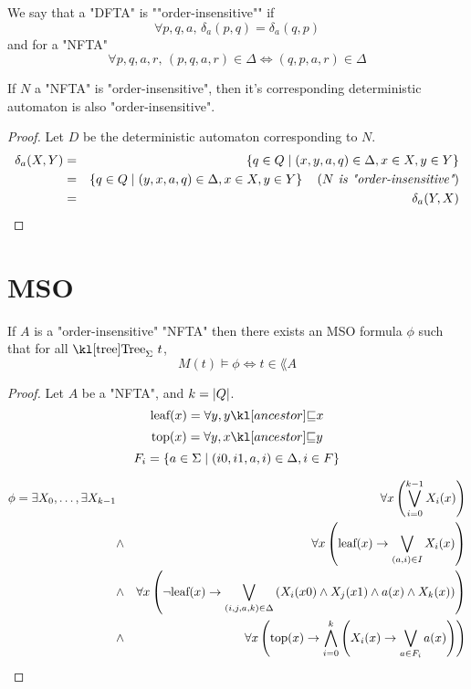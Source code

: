 \documentclass{article}
\begin{document}
\begin{definition}
	We say that a "DFTA" is ""order-insensitive"" if
	\[ \forall p,q,a,\, \delta_a (p,q) = \delta_a (q,p) \]
	and for a "NFTA"
	\[ \forall p,q,a,r,\, (p,q,a,r) \in \Delta \iff  (q,p,a,r) \in \Delta \]

\end{definition}


\begin{lemma}
	If $N$ a "NFTA" is "order-insensitive", then it's corresponding deterministic automaton is also "order-insensitive".
\end{lemma}

\begin{proof}
	Let $D$ be the deterministic automaton corresponding to $N$.
	\begin{eqnarray*}
		\delta_a (X,Y) &=& \left\{q \in Q \mid (x,y,a,q) \in \Delta, x \in X, y \in Y\right\} \\
		&=& \left\{q \in Q \mid (y,x,a,q) \in \Delta, x \in X, y \in Y\right\}  \quad\left(\textit{$N$ is "order-insensitive"}\right) \\
		&=& \delta_a (Y,X)
	\end{eqnarray*}
\end{proof}

\section{MSO}

\begin{theorem}
	If $A$ is a "order-insensitive" "NFTA"  then there exists an MSO formula $\phi$ such that for all $\tree_{\Sigma} \ t$,
	\[ M(t) \models \phi \iff t \in \lang A \]
\end{theorem}

\begin{proof}
	Let $A$ be a "NFTA", and $k = \left|Q\right|$.
	\[\text{leaf} (x) = \forall y, \ancestor y x \]
	\[\text{top} (x) = \forall y, \ancestor x y \]
	\[F_i = \left\{a \in \Sigma \mid (i0,i1,a,i) \in \Delta, i \in F\right\}\]


	\begin{eqnarray*}
		\phi = \exists X_0,\ldots, \exists X_{k-1} &\ & \forall x \left( \bigvee_{i=0}^{k-1} X_i(x) \right) \\
		&\land& \forall x \left( \text{leaf} (x) \rightarrow \bigvee_{(a,i)\in I}  X_i(x)   \right) \\
		&\land& \forall x \left(\lnot \text{leaf}(x) \rightarrow \bigvee_{(i,j,a,k)\in \Delta}  \left(X_i(x0) \land X_j(x1) \land a(x) \land X_k(x)\right)\right) \\
		&\land& \forall x \left(\text{top}(x) \rightarrow \bigwedge_{i= 0}^k \left( X_i(x) \rightarrow \bigvee_{a \in F_i} a(x) \right)\right)
	\end{eqnarray*}


\end{proof}





\end{document}
